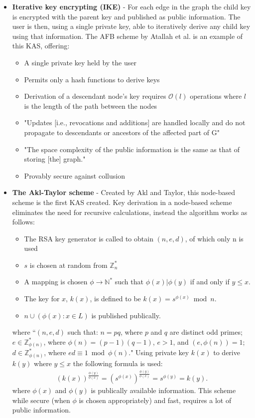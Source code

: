 \documentclass[10pt, titlepage]{article}
\begin{document}
\begin{itemize}
\item \textbf{Iterative key encrypting (IKE)} - For each edge in the graph the child key is encrypted with the parent key and published as public information. The user is then, using a single private key, able to iteratively derive any child key using that information\cite{lazyEncryption}. The AFB scheme by Atallah et al. is an example of this KAS, offering\cite{atallah2005}:
\begin{itemize}
\item A single private key held by the user
\item Permits only a hash functions to derive keys
\item Derivation of a descendant node's key requires $\mathcal{O}(l)$ operations where $l$ is the length of the path between the nodes
\item "Updates [i.e., revocations and additions] are handled locally and do not propagate to descendants or ancestors of the affected part of G"
\item "The space complexity of the public information is the same as that of
storing [the] graph."
\item Provably secure against collusion
\end{itemize}


\item \textbf{The Akl-Taylor scheme} - Created by Akl and Taylor, this node-based scheme is the first KAS created. Key derivation in a node-based scheme eliminates the need for recursive calculations, instead the algorithm works as follows\cite{lazyEncryption}:
\begin{itemize}
\item The RSA key generator is called to obtain $(n, e, d)$, of which only n is used
\item $s$ is chosen at random from $\mathbb{Z}^{*}_{n}$
\item A mapping is chosen $\phi \rightarrow \mathbb{N}^{*}$ such that $\phi(x) | \phi(y)$ if and only if $y≤x$.
\item The key for $x$, $k(x)$, is defined to be $k(x) = s^{ \phi (x)} \bmod n$.
\item ${n} \cup (\phi(x) : x ∈ L)$ is published publically.
\end{itemize}
where ``$(n, e, d)$ such that: $n = pq$, where $p$ and $q$ are distinct odd primes; $e ∈ \mathbb{Z}^{*}_{\phi(n)}$, where $\phi(n) = (p − 1)(q − 1)$, $e > 1$, and $(e, \phi(n)) = 1$; $d ∈ \mathbb{Z}^{*}_{\phi(n)}$, where $ed \equiv 1 \bmod \phi(n)$."
\newline Using private key $k(x)$ to derive $k(y)$ where $y≤x$ the following formula is used:
\begin{align*}
(k(x))^{\frac{\phi(y)}{\phi(x)}} = (s^{\phi(x)})^{\frac{\phi(y)}{\phi(x)}} = s^{\phi(y)} = k(y).
\end{align*}
where $\phi(x)$ and $\phi(y)$ is publically available information.
\newline \indent This scheme while secure (when $\phi$ is chosen appropriately) and fast, requires a lot of public information.
\end{itemize}
\end{document}
